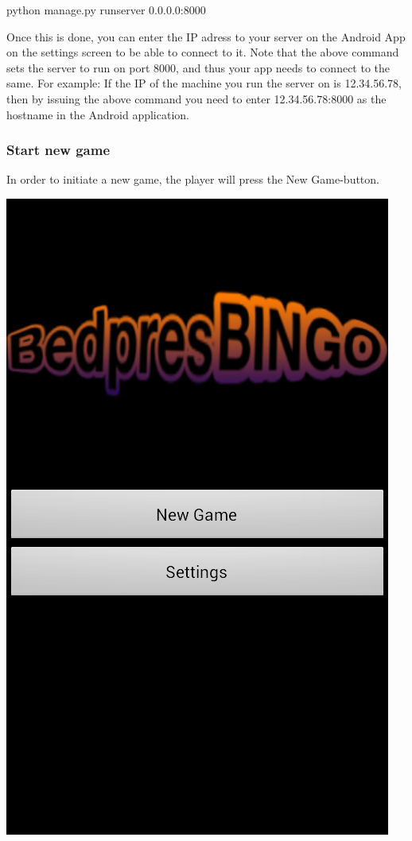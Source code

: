 python manage.py runserver 0.0.0.0:8000

Once this is done, you can enter the IP adress to your server on the Android App on the settings screen
to be able to connect to it. Note that the above command sets the server to run on port 8000,
and thus your app needs to connect to the same. For example: If the IP of the machine you run the server
on is 12.34.56.78, then by issuing the above command you need to enter 12.34.56.78:8000 as the hostname
in the Android application.

\subsubsection{Start new game}
In order to initiate a new game, the player will press the New Game-button.
\begin{center}
\includegraphics[scale=0.5]{Pikks/Mainmenu}
\end{center}

